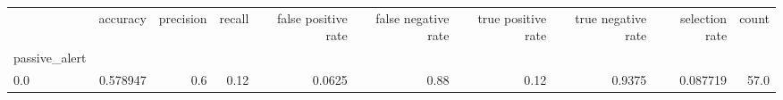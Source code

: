 \begin{tabular}{lrrrrrrrrr}
\toprule
{} &  accuracy &  precision &  recall &  false positive rate &  false negative rate &  true positive rate &  true negative rate &  selection rate &  count \\
passive\_alert &           &            &         &                      &                      &                     &                     &                 &        \\
\midrule
0.0           &  0.578947 &        0.6 &    0.12 &               0.0625 &                 0.88 &                0.12 &              0.9375 &        0.087719 &   57.0 \\
\bottomrule
\end{tabular}
